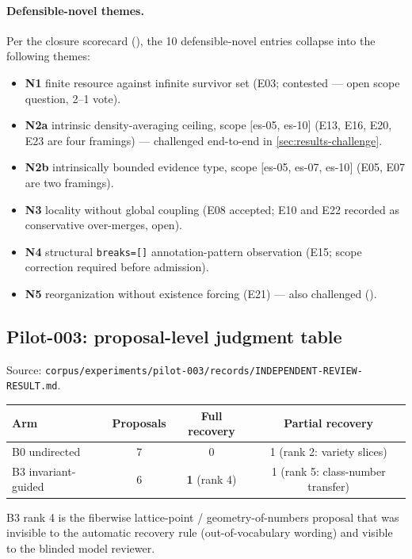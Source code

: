 \documentclass[11pt]{article}
\theoremstyle{gowthm}
\theoremstyle{gowplain}
\begin{document}
\paragraph{Defensible-novel themes.}
Per the closure scorecard
(), the 10 defensible-novel entries
collapse into the following themes:
\begin{itemize}[nosep]
  \item \textbf{N1} finite resource against infinite survivor set (E03;
    contested --- open scope question, 2--1 vote).
  \item \textbf{N2a} intrinsic density-averaging ceiling, scope
    $[$es-05, es-10$]$ (E13, E16, E20, E23 are four framings) ---
    challenged end-to-end in \cref{sec:results-challenge}.
  \item \textbf{N2b} intrinsically bounded evidence type, scope
    $[$es-05, es-07, es-10$]$ (E05, E07 are two framings).
  \item \textbf{N3} locality without global coupling (E08 accepted; E10 and
    E22 recorded as conservative over-merges, open).
  \item \textbf{N4} structural \texttt{breaks=[]} annotation-pattern
    observation (E15; scope correction required before admission).
  \item \textbf{N5} reorganization without existence forcing (E21) ---
    also challenged ().
\end{itemize}

\subsection{Pilot-003: proposal-level judgment table}

Source: \texttt{corpus/experiments/pilot-003/records/INDEPENDENT-REVIEW-RESULT.md}.

\begin{center}
\begin{tabular}{lccc}
\toprule
Arm & Proposals & Full recovery & Partial recovery \\
\midrule
B0 undirected & 7 & 0 & 1 (rank 2: variety slices) \\
B3 invariant-guided & 6 & \textbf{1} (rank 4) & 1 (rank 5: class-number transfer) \\
\bottomrule
\end{tabular}
\end{center}

B3 rank 4 is the fiberwise lattice-point / geometry-of-numbers proposal that
was invisible to the automatic recovery rule (out-of-vocabulary wording) and
visible to the blinded model reviewer.
\end{document}
